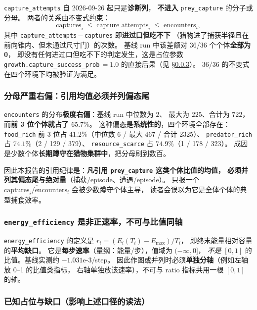 \texttt{capture\_attempts} 自 2026-09-26 起只是\textbf{诊断列}，
\textbf{不进入} \texttt{prey\_capture} 的分子或分母。
两者的关系由不变式约束：
\begin{equation}\label{eq:capture-ineq}
  \text{captures}_i \;\le\; \text{capture\_attempts}_i \;\le\; \text{encounters}_i ,
\end{equation}
其中 \texttt{capture\_attempts}\,$-$\,\texttt{captures} 即\textbf{进过口但吃不下}
（猎物进了捕获半径且在前向锥内、但未通过尺寸门）的次数。
基线 run 中该差额对 36/36 个个体\textbf{全部为 0}，
即没有任何进过口但吃不下的判定发生，这是占位参数
\texttt{growth.capture\_success\_prob}\,$=1.0$ 的直接后果（见 \S\ref{sec:exp-gaps}）。
$36/36$ 的不变式在四个环境下均被验证为满足。

\subsubsection{分母严重右偏：引用均值必须并列偏态尾}

\texttt{encounters} 的分布\textbf{极度右偏}：基线 run 中位数为 $2$、
最大为 $225$、合计为 $722$，而\textbf{前 3 位个体就占了 $65.7\%$}。
这种偏态是\textbf{系统性的}，四个环境全部存在：
\texttt{food\_rich} 前 3 位占 $41.2\%$（中位数 6 / 最大 467 / 合计 2325）、
\texttt{predator\_rich} 占 $74.1\%$（2 / 129 / 379）、
\texttt{resource\_scarce} 占 $74.9\%$（1 / 178 / 323）。
成因是少数个体\textbf{长期蹲守在猎物集群中}，把分母刷到数百。

因此本报告的引用纪律是：\textbf{凡引用 \texttt{prey\_capture} 这类个体比值的均值，
必须并列其偏态尾与绝对量}（捕获/episode、遭遇/episode）。
只报一个 $\overline{\text{captures}_i/\text{encounters}_i}$ 会被少数蹲守个体主导，
读者会误以为它是全体个体的典型捕食效率。

\subsubsection{\texttt{energy\_efficiency} 是非正速率，不可与比值同轴}

\texttt{energy\_efficiency} 的定义是
$r_i=(E_i(T_i)-E_{\max})/T_i$，
即终末能量相对容量的\textbf{平均缺口}。
它是\textbf{每步速率}（量纲：能量/步），值域为 $(-\infty,0]$，
\emph{不是} $[0,1]$ 的比值。基线实测约 $-1.031\text{e-}3$/step。
因此作图或并列时必须\textbf{单独分轴}（例如左轴放 0--1 的比值类指标，
右轴单独放该速率），不可与 ratio 指标共用一根 $[0,1]$ 的轴。

\subsubsection{已知占位与缺口（影响上述口径的读法）}\label{sec:exp-gaps}

